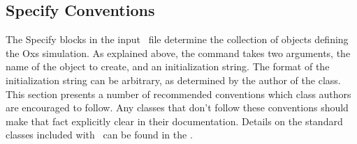 \subsection{Specify Conventions}%
\label{sec:specConventions}
The Specify blocks in the input \MIF\ file determine the collection
of  objects defining the Oxs simulation.  As explained
above, the  command takes two
arguments, the name of the  object to create, and an
initialization string.  The format of the initialization string can
be arbitrary, as determined by the author of the  class.
This section presents a number of recommended conventions which
 class authors are encouraged to follow.  Any 
classes that don't follow these conventions should make that fact
explicitly clear in their documentation.
Details on the standard  classes included with \OOMMF\ can
be found in the
.
{}

